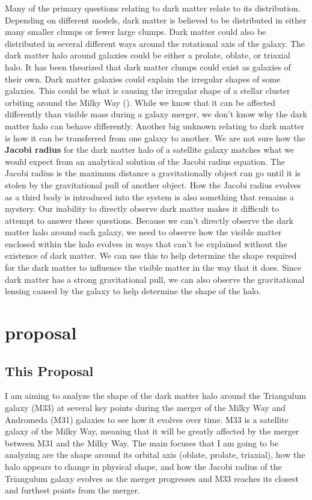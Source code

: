 \documentclass[fleqn,usenatbib]{mnras}
\begin{document}
        Many of the primary questions relating to dark matter relate to its distribution. Depending on different models, dark matter is believed to be distributed in either many smaller clumps or fewer large clumps. Dark matter could also be distributed in several different ways around the rotational axis of the galaxy. The dark matter halo around galaxies could be either a prolate, oblate, or triaxial halo. It has been theorized that dark matter clumps could exist as galaxies of their own. Dark matter galaxies could explain the irregular shapes of some galaxies. This could be what is causing the irregular shape of a stellar cluster orbiting around the Milky Way (\citet{Erkal2017}). While we know that it can be affected differently than visible mass during a galaxy merger, we don't know why the dark matter halo can behave differently. Another big unknown relating to dark matter is how it can be transferred from one galaxy to another. We are not sure how the \textbf{Jacobi radius} for the dark matter halo of a satellite galaxy matches what we would expect from an analytical solution of the Jacobi radius equation. The Jacobi radius is the maximum distance a gravitationally object can go until it is stolen by the gravitational pull of another object. How the Jacobi radius evolves as a third body is introduced into the system is also something that remains a mystery. Our inability to directly observe dark matter makes it difficult to attempt to answer these questions. Because we can't directly observe the dark matter halo around each galaxy, we need to observe how the visible matter enclosed within the halo evolves in ways that can't be explained without the existence of dark matter. We can use this to help determine the shape required for the dark matter to influence the visible matter in the way that it does. Since dark matter has a strong gravitational pull, we can also observe the gravitational lensing caused by the galaxy to help determine the shape of the halo.


\section {proposal}
\subsection{This Proposal}
        I am aiming to analyze the shape of the dark matter halo around the Triangulum galaxy (M33) at several key points during the merger of the Milky Way and Andromeda (M31) galaxies to see how it evolves over time. M33 is a satellite galaxy of the Milky Way, meaning that it will be greatly affected by the merger between M31 and the Milky Way. The main focuses that I am going to be analyzing are the shape around its orbital axis (oblate, prolate, triaxial), how the halo appears to change in physical shape, and how the Jacobi radius of the Triangulum galaxy evolves as the merger progresses and M33 reaches its closest and furthest points from the merger.
\end{document}
